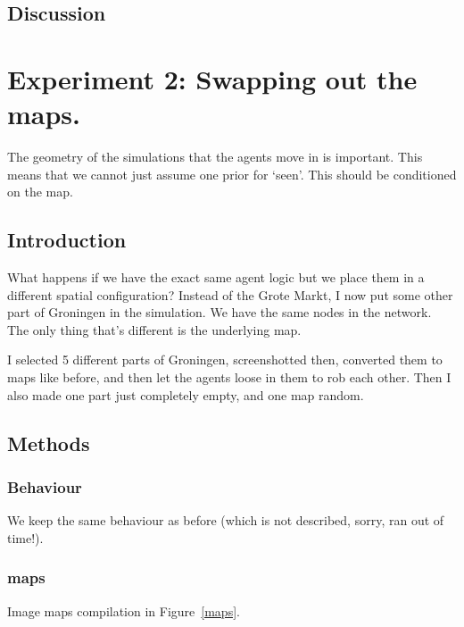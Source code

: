 \subsection{Discussion}

\section{Experiment 2: Swapping out the maps.}
The geometry of the simulations that the agents move in is important. This means that we cannot just assume one prior for `seen'. This should be conditioned on the map.

\subsection{Introduction}
What happens if we have the exact same agent logic but we place them in a different spatial configuration? Instead of the Grote Markt, I now put some other part of Groningen in the simulation. We have the same nodes in the network. The only thing that's different is the underlying map.

I selected 5 different parts of Groningen, screenshotted then, converted them to maps like before, and then let the agents loose in them to rob each other.  Then I also made one part just completely empty, and one map random.

\subsection{Methods}

\subsubsection{Behaviour}
We keep the same behaviour as before (which is not described, sorry, ran out of time!).

\subsubsection{maps}
Image maps compilation in Figure~\ref{maps}.

